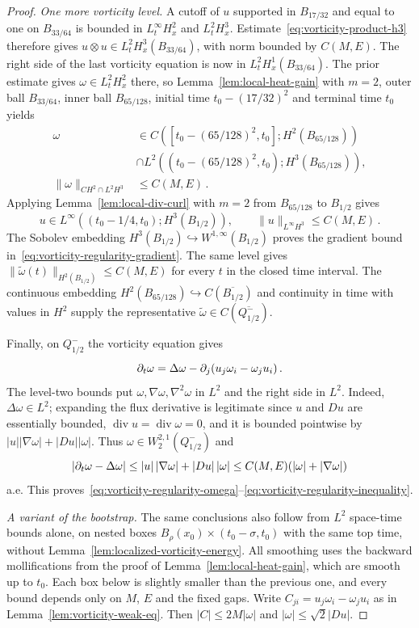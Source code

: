 \documentclass[11pt,letterpaper]{article}
\numberwithin{equation}{section}
\theoremstyle{plain}
\theoremstyle{definition}
\theoremstyle{remark}
\begin{document}
\begin{proof}
\emph{One more vorticity level.} A cutoff of $u$ supported in $B_{17/32}$ and equal to one on $B_{33/64}$ is bounded in $L^\infty_tH^2_x$ and $L^2_tH^3_x$. Estimate~\eqref{eq:vorticity-product-h3} therefore gives $u\otimes u\in L^2_tH^3_x(B_{33/64})$, with norm bounded by $C(M,E)$. The right side of the last vorticity equation is now in $L^2_tH^1_x(B_{33/64})$. The prior estimate gives $\omega\in L^2_tH^2_x$ there, so Lemma~\ref{lem:local-heat-gain} with $m=2$, outer ball $B_{33/64}$, inner ball $B_{65/128}$, initial time $t_0-(17/32)^2$ and terminal time $t_0$ yields
\[
\begin{aligned}
 \omega&\in C([t_0-(65/128)^2,t_0];H^2(B_{65/128}))\\
  &\cap L^2((t_0-(65/128)^2,t_0);H^3(B_{65/128})),\\
 \|\omega\|_{C H^2\cap L^2H^3}&\le C(M,E)\,.
\end{aligned}
\]
Applying Lemma~\ref{lem:local-div-curl} with $m=2$ from $B_{65/128}$ to $B_{1/2}$ gives
\[
 u\in L^\infty((t_0-1/4,t_0);H^3(B_{1/2})),
 \qquad \|u\|_{L^\infty H^3}\le C(M,E)\,.
\]
The Sobolev embedding $H^3(B_{1/2})\hookrightarrow W^{1,\infty}(B_{1/2})$ proves the gradient bound in~\eqref{eq:vorticity-regularity-gradient}. The same level gives $\|\widetilde\omega(t)\|_{H^2(B_{1/2})}\le C(M,E)$ for every $t$ in the closed time interval. The continuous embedding $H^2(B_{65/128})\hookrightarrow C(\overline{B_{1/2}})$ and continuity in time with values in $H^2$ supply the representative $\widetilde\omega\in C(\overline{Q_{1/2}^-})$.

Finally, on $Q_{1/2}^-$ the vorticity equation gives
\[
 \partial_t\omega=\Delta\omega-\partial_j(u_j\omega_i-\omega_j u_i)\,.
\]
The level-two bounds put $\omega,\nabla\omega,\nabla^2\omega$ in $L^2$ and the right side in $L^2$. Indeed, $\Delta\omega\in L^2$; expanding the flux derivative is legitimate since $u$ and $Du$ are essentially bounded, $\operatorname{div}u=\operatorname{div}\omega=0$, and it is bounded pointwise by $|u||\nabla\omega|+|Du||\omega|$. Thus $\omega\in W^{2,1}_2(Q_{1/2}^-)$ and
\[
 |\partial_t\omega-\Delta\omega|
 \le |u|\,|\nabla\omega|+|Du|\,|\omega|
 \le C(M,E)(|\omega|+|\nabla\omega|)
\]
a.e. This proves~\eqref{eq:vorticity-regularity-omega}--\eqref{eq:vorticity-regularity-inequality}.

\emph{A variant of the bootstrap.} The same conclusions also follow from $L^2$ space-time bounds alone, on nested boxes $B_\rho(x_0)\times(t_0-\sigma,t_0)$ with the same top time, without Lemma~\ref{lem:localized-vorticity-energy}. All smoothing uses the backward mollifications from the proof of Lemma~\ref{lem:local-heat-gain}, which are smooth up to $t_0$. Each box below is slightly smaller than the previous one, and every bound depends only on $M$, $E$ and the fixed gaps. Write $C_{ji}=u_j\omega_i-\omega_ju_i$ as in Lemma~\ref{lem:vorticity-weak-eq}. Then $|C|\le2M|\omega|$ and $|\omega|\le\sqrt2|Du|$.


\end{proof}
\end{document}
